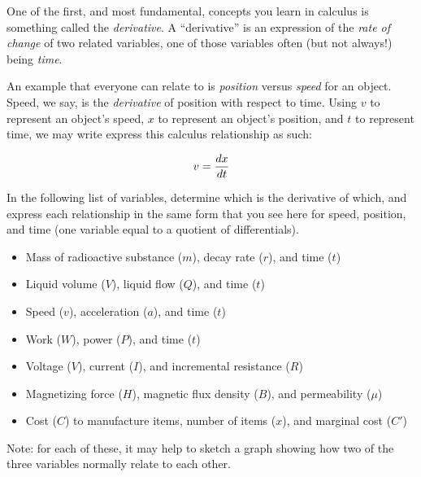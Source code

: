 

One of the first, and most fundamental, concepts you learn in calculus is something called the {\it derivative}.  A ``derivative'' is an expression of the {\it rate of change} of two related variables, one of those variables often (but not always!) being {\it time}.

An example that everyone can relate to is {\it position} versus {\it speed} for an object.  Speed, we say, is the {\it derivative} of position with respect to time.  Using $v$ to represent an object's speed, $x$ to represent an object's position, and $t$ to represent time, we may write express this calculus relationship as such:

$$v = {dx \over dt}$$

\filbreak

In the following list of variables, determine which is the derivative of which, and express each relationship in the same form that you see here for speed, position, and time (one variable equal to a quotient of differentials).

\vskip 10pt

\begin{itemize}
\item{} Mass of radioactive substance ($m$), decay rate ($r$), and time ($t$)
\vskip 10pt 
\item{} Liquid volume ($V$), liquid flow ($Q$), and time ($t$)
\vskip 10pt 
\item{} Speed ($v$), acceleration ($a$), and time ($t$)
\vskip 10pt 
\item{} Work ($W$), power ($P$), and time ($t$)
\vskip 10pt 
\item{} Voltage ($V$), current ($I$), and incremental resistance ($R$)
\vskip 10pt 
\item{} Magnetizing force ($H$), magnetic flux density ($B$), and permeability ($\mu$)
\vskip 10pt 
\item{} Cost ($C$) to manufacture items, number of items ($x$), and marginal cost ($C'$)
\end{itemize}

\vskip 10pt

Note: for each of these, it may help to sketch a graph showing how two of the three variables normally relate to each other.






